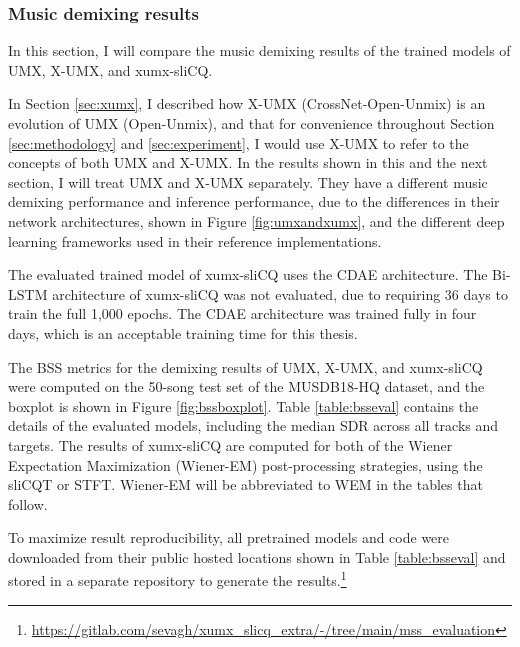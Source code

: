 \documentclass[report.tex]{subfiles}
\begin{document}
\subsubsection{Music demixing results}
\label{sec:demixresults}

In this section, I will compare the music demixing results of the trained models of UMX, X-UMX, and xumx-sliCQ.

In Section \ref{sec:xumx}, I described how X-UMX (CrossNet-Open-Unmix) is an evolution of UMX (Open-Unmix), and that for convenience throughout Section \ref{sec:methodology} and \ref{sec:experiment}, I would use X-UMX to refer to the concepts of both UMX and X-UMX. In the results shown in this and the next section, I will treat UMX and X-UMX separately. They have a different music demixing performance and inference performance, due to the differences in their network architectures, shown in Figure \ref{fig:umxandxumx}, and the different deep learning frameworks used in their reference implementations.

The evaluated trained model of xumx-sliCQ uses the CDAE architecture. The Bi-LSTM architecture of xumx-sliCQ was not evaluated, due to requiring 36 days to train the full 1,000 epochs. The CDAE architecture was trained fully in four days, which is an acceptable training time for this thesis.

The BSS metrics for the demixing results of UMX, X-UMX, and xumx-sliCQ were computed on the 50-song test set of the MUSDB18-HQ dataset, and the boxplot is shown in Figure \ref{fig:bssboxplot}. Table \ref{table:bsseval} contains the details of the evaluated models, including the median SDR across all tracks and targets. The results of xumx-sliCQ are computed for both of the Wiener Expectation Maximization (Wiener-EM) post-processing strategies, using the sliCQT or STFT. Wiener-EM will be abbreviated to WEM in the tables that follow.

To maximize result reproducibility, all pretrained models and code were downloaded from their public hosted locations shown in Table \ref{table:bsseval} and stored in a separate repository to generate the results.\footnote{\url{https://gitlab.com/sevagh/xumx_slicq_extra/-/tree/main/mss_evaluation}}
\end{document}
